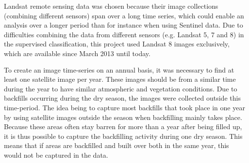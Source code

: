 \documentclass[11pt, A4, oneside]{report}
\begin{document}
Landsat remote sensing data was chosen because their image collections (combining different sensors) span over a long time series, which could enable an analysis over a longer period than for instance when using Sentinel data. Due to difficulties combining the data from different sensors (e.g. Landsat 5, 7 and 8) in the supervised classification, this project used Landsat 8 images exclusively, which are available since March 2013 until today. %

To create an image time-series on an annual basis, it was necessary to find at least one satellite image per year. These images should be from a similar time during the year to have similar atmospheric and vegetation conditions. Due to backfills occurring during the dry season, the images were collected outside this time-period. The idea being to capture most backfills that took place in one year by using satellite images outside the season when backfilling mainly takes place. Because these areas often stay barren for more than a year after being filled up, it is thus possible to capture the backfilling activity during one dry season. This means that if areas are backfilled and built over both in the same year, this would not be captured in the data. %
\end{document}
